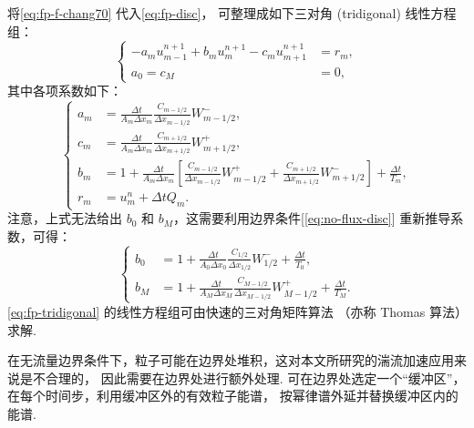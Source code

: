 将\autoref{eq:fp-f-chang70} 代入\autoref{eq:fp-disc}，
可整理成如下三对角 (tridigonal) 线性方程组：
\begin{equation}
  \label{eq:fp-tridigonal}
  \left\{
    \begin{aligned}
      -a_m u_{m-1}^{n+1} + b_m u_m^{n+1} - c_m u_{m+1}^{n+1} & = r_m, \\
      a_0 = c_M & = 0 ,
    \end{aligned}
  \right.
\end{equation}
其中各项系数如下：
\begin{equation}
  \label{eq:fp-coefs}
  \left\{
    \begin{aligned}
      a_m & = \frac{\Delta t}{A_m \Delta x_m}
        \frac{C_{m-1/2}}{\Delta x_{m-1/2}} W_{m-1/2}^{-} , \\
      c_m & = \frac{\Delta t}{A_m \Delta x_m}
        \frac{C_{m+1/2}}{\Delta x_{m+1/2}} W_{m+1/2}^{+} , \\
      b_m & = 1 + \frac{\Delta t}{A_m \Delta x_m}
        \left[ \frac{C_{m-1/2}}{\Delta x_{m-1/2}} W_{m-1/2}^{+}
        + \frac{C_{m+1/2}}{\Delta x_{m+1/2}} W_{m+1/2}^{-} \right]
        + \frac{\Delta t}{T_m} , \\
      r_m & = u_m^n + \Delta t Q_m .
    \end{aligned}
  \right.
\end{equation}
注意，上式无法给出 $b_0$ 和 $b_M$，这需要利用边界条件[\autoref{eq:no-flux-disc}]
重新推导系数，可得：
\begin{equation}
  \label{eq:fp-coefs-b}
  \left\{
    \begin{aligned}
      b_0 & = 1 + \frac{\Delta t}{A_0 \Delta x_0}
        \frac{C_{1/2}}{\Delta x_{1/2}} W_{1/2}^{-}
        + \frac{\Delta t}{T_0} , \\
      b_M & = 1 + \frac{\Delta t}{A_M \Delta x_M}
        \frac{C_{M-1/2}}{\Delta x_{M-1/2}} W_{M-1/2}^{+}
        + \frac{\Delta t}{T_M} .
    \end{aligned}
  \right.
\end{equation}
\autoref{eq:fp-tridigonal} 的线性方程组可由快速的三对角矩阵算法
（亦称 Thomas 算法）求解\cite{press1992}.

在无流量边界条件下，粒子可能在边界处堆积，这对本文所研究的湍流加速应用来说是不合理的，
因此需要在边界处进行额外处理.
可在边界处选定一个\enquote{缓冲区}，在每个时间步，利用缓冲区外的有效粒子能谱，
按幂律谱外延并替换缓冲区内的能谱\cite{borovsky1986,donnert2014}.


